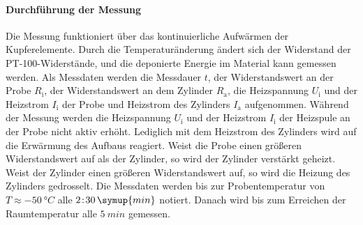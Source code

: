 \paragraph{Durchführung der Messung}
Die Messung funktioniert über das kontinuierliche Aufwärmen der Kupferelemente.
Durch die Temperaturänderung ändert sich der Widerstand der PT-100-Widerstände, und die deponierte Energie im Material kann gemessen werden.
Als Messdaten werden die Messdauer $t$, der Widerstandswert an der Probe $R_{\text{i}}$, der Widerstandswert an dem Zylinder $R_{\text{a}}$, die Heizspannung $U_{\text{i}}$ und der Heizstrom $I_{\text{i}}$ der Probe und Heizstrom des Zylinders $I_{\text{a}}$ aufgenommen.
Während der Messung werden die Heizspannung $U_{\text{i}}$ und der Heizstrom $I_{\text{i}}$ der Heizspule an der Probe nicht aktiv erhöht.
Lediglich mit dem Heizstrom des Zylinders wird auf die Erwärmung des Aufbaus reagiert.
Weist die Probe einen größeren Widerstandswert auf als der Zylinder, so wird der Zylinder verstärkt geheizt.
Weist der Zylinder einen größeren Widerstandswert auf, so wird die Heizung des Zylinders gedrosselt.
Die Messdaten werden bis zur Probentemperatur von $T \approx \SI{-50}{°C}$ alle $2\!:\!30 \, \symup{min}$ notiert.
Danach wird bis zum Erreichen der Raumtemperatur alle $\SI{5}{min}$ gemessen.
